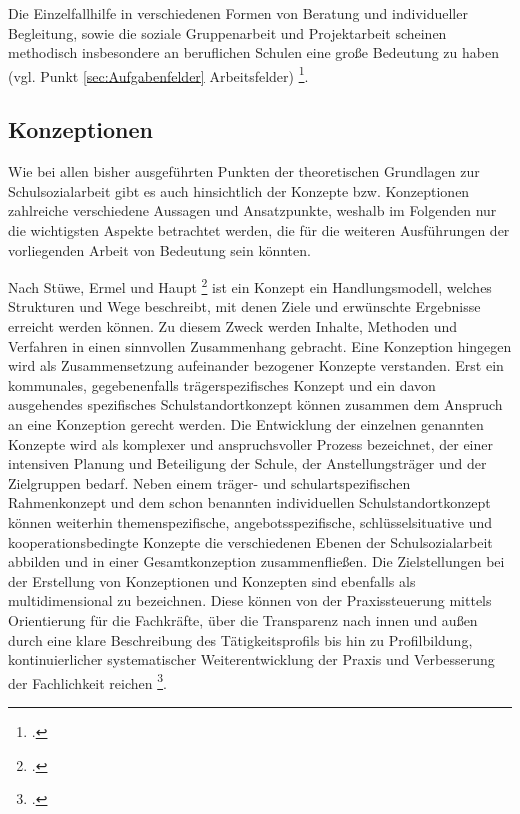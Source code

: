 Die Einzelfallhilfe in verschiedenen Formen von Beratung und individueller Begleitung, sowie die soziale Gruppenarbeit und Projektarbeit scheinen methodisch insbesondere an beruflichen Schulen eine große Bedeutung zu haben (vgl. Punkt \ref{sec:Aufgabenfelder} Arbeitsfelder) \footcite[vgl.][10ff]{LSS2004}. 

\subsection{Konzeptionen}
\label{sec:Konzeptionen}

Wie bei allen bisher ausgeführten Punkten der theoretischen Grundlagen zur Schulsozialarbeit gibt es auch hinsichtlich der Konzepte bzw. Konzeptionen zahlreiche verschiedene Aussagen und Ansatzpunkte, weshalb im Folgenden nur die wichtigsten Aspekte betrachtet werden, die für die weiteren Ausführungen der vorliegenden Arbeit von Bedeutung sein könnten. 

Nach Stüwe, Ermel und Haupt \footcite[vgl.][148]{Stuewe2015} ist ein Konzept ein Handlungsmodell, welches Strukturen und Wege beschreibt, mit denen Ziele und erwünschte Ergebnisse erreicht werden können. Zu diesem Zweck werden Inhalte, Methoden und Verfahren in einen sinnvollen Zusammenhang gebracht. Eine Konzeption hingegen wird als Zusammensetzung aufeinander bezogener Konzepte verstanden. Erst ein kommunales, gegebenenfalls trägerspezifisches Konzept und ein davon ausgehendes spezifisches Schulstandortkonzept können zusammen dem Anspruch an eine Konzeption gerecht werden. Die Entwicklung der einzelnen genannten Konzepte wird als komplexer und anspruchsvoller Prozess bezeichnet, der einer intensiven Planung und Beteiligung der Schule, der Anstellungsträger und der Zielgruppen bedarf. Neben einem träger- und schulartspezifischen Rahmenkonzept und dem schon benannten individuellen Schulstandortkonzept können weiterhin themenspezifische, angebotsspezifische, schlüsselsituative und kooperationsbedingte Konzepte die verschiedenen Ebenen der Schulsozialarbeit abbilden und in einer Gesamtkonzeption zusammenfließen. Die Zielstellungen bei der Erstellung von Konzeptionen und Konzepten sind ebenfalls als multidimensional zu bezeichnen. Diese können von der Praxissteuerung mittels Orientierung für die Fachkräfte, über die Transparenz nach innen und außen durch eine klare Beschreibung des Tätigkeitsprofils bis hin zu Profilbildung, kontinuierlicher systematischer Weiterentwicklung der Praxis und Verbesserung der Fachlichkeit reichen \footcite[vgl.][148ff]{Stuewe2015}.

